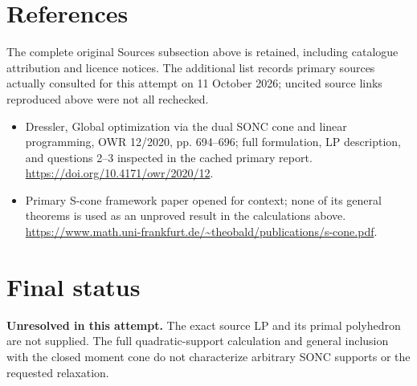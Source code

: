 \documentclass[11pt]{article}
\begin{document}
\section{References}
The complete original Sources subsection above is retained, including catalogue attribution and licence notices. The additional list records primary sources actually consulted for this attempt on 11 October 2026; uncited source links reproduced above were not all rechecked.
\begin{itemize}
\item Dressler, Global optimization via the dual SONC cone and linear programming, OWR 12/2020, pp. 694--696; full formulation, LP description, and questions 2--3 inspected in the cached primary report. \url{https://doi.org/10.4171/owr/2020/12}.
\item Primary S-cone framework paper opened for context; none of its general theorems is used as an unproved result in the calculations above. \url{https://www.math.uni-frankfurt.de/~theobald/publications/s-cone.pdf}.
\end{itemize}
\section{Final status}
\textbf{Unresolved in this attempt.} The exact source LP and its primal polyhedron are not supplied. The full quadratic-support calculation and general inclusion with the closed moment cone do not characterize arbitrary SONC supports or the requested relaxation.
\end{document}
